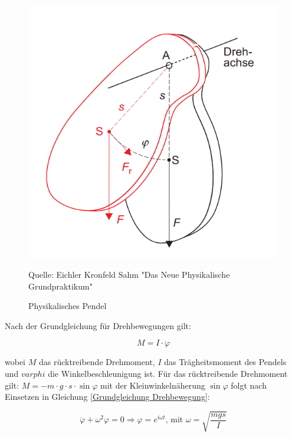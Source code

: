 \begin{figure}[ht]
    \centering
    \includegraphics[scale=0.3]{Pendel/Protokoll/fig/Physikalisches Pendel.png}
    \caption{Physikalisches Pendel}
    \label{fig:Physikalisches Pendel}
    Quelle: Eichler Kronfeld Sahm "Das Neue Physikalische Grundpraktikum"
\end{figure}

Nach der Grundgleichung für Drehbewegungen gilt:

\begin{equation} \label{Grundgleichung Drehbewegung}
    M = I \cdot \ddot{\varphi}
\end{equation}

wobei $M$ das rücktreibende Drehmoment, $I$ das Trägheitsmoment des Pendels und $varphi$ die Winkelbeschleunigung ist. Für das rücktreibende Drehmoment gilt: $M = -m \cdot g \cdot s \cdot \sin{\varphi}$ mit der Kleinwinkelnäherung $\sin{\varphi}$ folgt nach Einsetzen in Gleichung \ref{Grundgleichung Drehbewegung}:

\begin{equation} \label{Schwingungsgleichung eines physikalischen Pendels}
\ddot{\varphi} + \omega^2\varphi = 0
\Rightarrow \varphi = e^{i \omega t} \text{, mit } \omega = \sqrt{\frac{mgs}{I}}
\end{equation}

